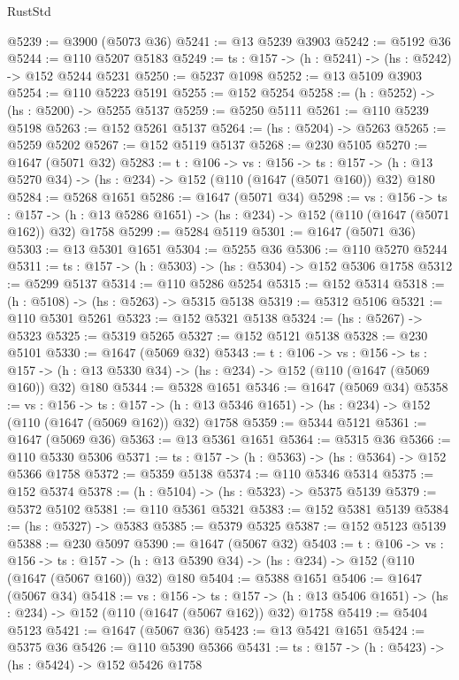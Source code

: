 \begin{lexlean}{RustStd}
\begin{coremodule}
@5239 := @3900 (@5073 @36)
@5241 := @13 @5239 @3903
@5242 := @5192 @36
@5244 := @110 @5207 @5183
@5249 := {ts : @157} -> (h : @5241) -> (hs : @5242) -> @152 @5244 @5231
@5250 := @5237 @1098
@5252 := @13 @5109 @3903
@5254 := @110 @5223 @5191
@5255 := @152 @5254
@5258 := (h : @5252) -> (hs : @5200) -> @5255 @5137
@5259 := @5250 @5111
@5261 := @110 @5239 @5198
@5263 := @152 @5261 @5137
@5264 := (hs : @5204) -> @5263
@5265 := @5259 @5202
@5267 := @152 @5119 @5137
@5268 := @230 @5105
@5270 := @1647 (@5071 @32)
@5283 := {t : @106} ->
  {vs : @156} ->
  {ts : @157} -> (h : @13 @5270 @34) -> (hs : @234) -> @152 (@110 (@1647 (@5071 @160)) @32) @180
@5284 := @5268 @1651
@5286 := @1647 (@5071 @34)
@5298 := {vs : @156} ->
  {ts : @157} -> (h : @13 @5286 @1651) -> (hs : @234) -> @152 (@110 (@1647 (@5071 @162)) @32) @1758
@5299 := @5284 @5119
@5301 := @1647 (@5071 @36)
@5303 := @13 @5301 @1651
@5304 := @5255 @36
@5306 := @110 @5270 @5244
@5311 := {ts : @157} -> (h : @5303) -> (hs : @5304) -> @152 @5306 @1758
@5312 := @5299 @5137
@5314 := @110 @5286 @5254
@5315 := @152 @5314
@5318 := (h : @5108) -> (hs : @5263) -> @5315 @5138
@5319 := @5312 @5106
@5321 := @110 @5301 @5261
@5323 := @152 @5321 @5138
@5324 := (hs : @5267) -> @5323
@5325 := @5319 @5265
@5327 := @152 @5121 @5138
@5328 := @230 @5101
@5330 := @1647 (@5069 @32)
@5343 := {t : @106} ->
  {vs : @156} ->
  {ts : @157} -> (h : @13 @5330 @34) -> (hs : @234) -> @152 (@110 (@1647 (@5069 @160)) @32) @180
@5344 := @5328 @1651
@5346 := @1647 (@5069 @34)
@5358 := {vs : @156} ->
  {ts : @157} -> (h : @13 @5346 @1651) -> (hs : @234) -> @152 (@110 (@1647 (@5069 @162)) @32) @1758
@5359 := @5344 @5121
@5361 := @1647 (@5069 @36)
@5363 := @13 @5361 @1651
@5364 := @5315 @36
@5366 := @110 @5330 @5306
@5371 := {ts : @157} -> (h : @5363) -> (hs : @5364) -> @152 @5366 @1758
@5372 := @5359 @5138
@5374 := @110 @5346 @5314
@5375 := @152 @5374
@5378 := (h : @5104) -> (hs : @5323) -> @5375 @5139
@5379 := @5372 @5102
@5381 := @110 @5361 @5321
@5383 := @152 @5381 @5139
@5384 := (hs : @5327) -> @5383
@5385 := @5379 @5325
@5387 := @152 @5123 @5139
@5388 := @230 @5097
@5390 := @1647 (@5067 @32)
@5403 := {t : @106} ->
  {vs : @156} ->
  {ts : @157} -> (h : @13 @5390 @34) -> (hs : @234) -> @152 (@110 (@1647 (@5067 @160)) @32) @180
@5404 := @5388 @1651
@5406 := @1647 (@5067 @34)
@5418 := {vs : @156} ->
  {ts : @157} -> (h : @13 @5406 @1651) -> (hs : @234) -> @152 (@110 (@1647 (@5067 @162)) @32) @1758
@5419 := @5404 @5123
@5421 := @1647 (@5067 @36)
@5423 := @13 @5421 @1651
@5424 := @5375 @36
@5426 := @110 @5390 @5366
@5431 := {ts : @157} -> (h : @5423) -> (hs : @5424) -> @152 @5426 @1758

\end{coremodule}
\end{lexlean}
